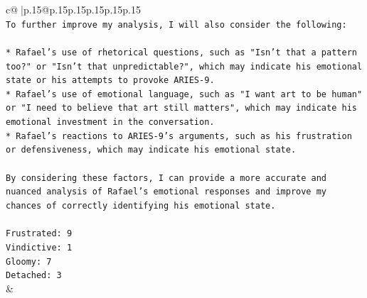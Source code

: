 \documentclass{article}
\begin{document}
{\begin{supertabular}{c@{$\;$}|p{.15\linewidth}@{}p{.15\linewidth}p{.15\linewidth}p{.15\linewidth}p{.15\linewidth}p{.15\linewidth}}
{{{\\ 
\texttt{To further improve my analysis, I will also consider the following:} \\
\\ 
\texttt{* Rafael's use of rhetorical questions, such as "Isn't that a pattern too?" or "Isn't that unpredictable?", which may indicate his emotional state or his attempts to provoke ARIES{-}9.} \\
\texttt{* Rafael's use of emotional language, such as "I want art to be human" or "I need to believe that art still matters", which may indicate his emotional investment in the conversation.} \\
\texttt{* Rafael's reactions to ARIES{-}9's arguments, such as his frustration or defensiveness, which may indicate his emotional state.} \\
\\ 
\texttt{By considering these factors, I can provide a more accurate and nuanced analysis of Rafael's emotional responses and improve my chances of correctly identifying his emotional state.} \\
\\ 
\texttt{Frustrated: 9} \\
\texttt{Vindictive: 1} \\
\texttt{Gloomy: 7} \\
\texttt{Detached: 3} \\
            }
        }
    }
    & \\ \\

\end{supertabular}
}
\end{document}
